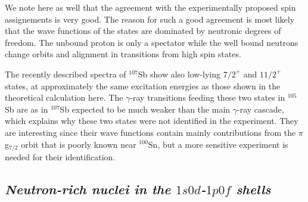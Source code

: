 \documentclass[twoside,12pt]{article}
\begin{document}
We note here as well that
the agreement with the experimentally 
proposed spin assignements is very good.
The reason for such a good
agreement is most likely that the wave functions of the 
states are dominated by neutronic degrees of freedom.
The unbound proton is 
only a spectator
while the well bound neutrons change orbits and alignment
in transitions from high spin states.

The recently described spectra of $^{107}$Sb show also
low-lying $7/2^+$ and $11/2^+$ states, at approximately the 
same excitation energies as those shown in the theoretical calculation 
here. The $\gamma$-ray transitions feeding these two states in 
$^{105}$Sb are as in $^{107}$Sb expected to be much weaker than 
the main $\gamma$-ray cascade, which explains why these two states
were not identified in the experiment. They are interesting since
their wave functions contain mainly contributions from the $\pi$g$_{7/2}$
orbit that is poorly known near $^{100}$Sn, but
a more sensitive experiment
is needed for their identification.

\subsection{\it Neutron-rich nuclei in the $1s0d$-$1p0f$ shells}\label{subsec:sdpfshells}
\end{document}
